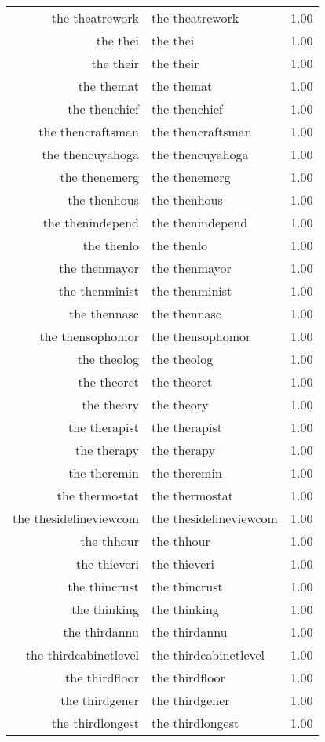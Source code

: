 \begin{table}[ht]
\begin{tabular}{rlr}
  the theatrework & the theatrework & 1.00 \\ 
  the thei & the thei & 1.00 \\ 
  the their & the their & 1.00 \\ 
  the themat & the themat & 1.00 \\ 
  the thenchief & the thenchief & 1.00 \\ 
  the thencraftsman & the thencraftsman & 1.00 \\ 
  the thencuyahoga & the thencuyahoga & 1.00 \\ 
  the thenemerg & the thenemerg & 1.00 \\ 
  the thenhous & the thenhous & 1.00 \\ 
  the thenindepend & the thenindepend & 1.00 \\ 
  the thenlo & the thenlo & 1.00 \\ 
  the thenmayor & the thenmayor & 1.00 \\ 
  the thenminist & the thenminist & 1.00 \\ 
  the thennasc & the thennasc & 1.00 \\ 
  the thensophomor & the thensophomor & 1.00 \\ 
  the theolog & the theolog & 1.00 \\ 
  the theoret & the theoret & 1.00 \\ 
  the theory & the theory & 1.00 \\ 
  the therapist & the therapist & 1.00 \\ 
  the therapy & the therapy & 1.00 \\ 
  the theremin & the theremin & 1.00 \\ 
  the thermostat & the thermostat & 1.00 \\ 
  the thesidelineviewcom & the thesidelineviewcom & 1.00 \\ 
  the thhour & the thhour & 1.00 \\ 
  the thieveri & the thieveri & 1.00 \\ 
  the thincrust & the thincrust & 1.00 \\ 
  the thinking & the thinking & 1.00 \\ 
  the thirdannu & the thirdannu & 1.00 \\ 
  the thirdcabinetlevel & the thirdcabinetlevel & 1.00 \\ 
  the thirdfloor & the thirdfloor & 1.00 \\ 
  the thirdgener & the thirdgener & 1.00 \\ 
  the thirdlongest & the thirdlongest & 1.00 \\ 

\end{tabular}
\end{table}
